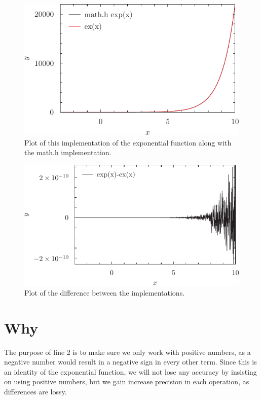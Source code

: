 \documentclass[twocolumn]{article}
\begin{document}

	\begin{figure}[h]
\includegraphics[width=\columnwidth]{exp_pyx.pdf}
\caption{Plot of this implementation of the exponential function along with the math.h implementation.}
\label{fig:exp}
	\end{figure}
	
		\begin{figure}[h]
\includegraphics[width=\columnwidth]{exp_diff_pyx.pdf}
\caption{Plot of the difference between the implementations.}
\label{fig:exp_diff}
	\end{figure}
	
	
\section{Why}
The purpose of line 2 is to make sure we only work with positive numbers, as a negative number would result in a negative sign in every other term. Since this is an identity of the exponential function, we will not lose any accuracy by insisting on using positive numbers, but we gain increase precision in each operation, as differences are lossy.
\end{document}
